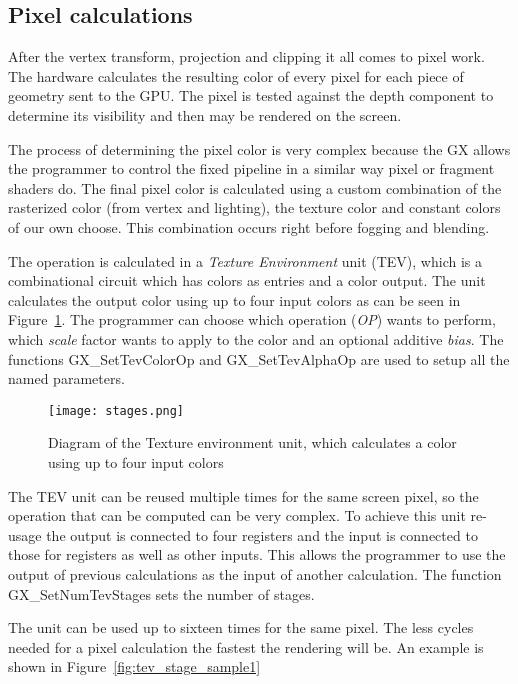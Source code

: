 \documentclass[12pt]{article}
\newcommand{\fname}[1] {{\color{blue}#1}}
\begin{document}
\subsection{Pixel calculations}

After the vertex transform, projection and clipping it all comes to pixel work. The hardware calculates the resulting color of every pixel for each piece of geometry sent to the GPU. The pixel is tested against the depth component to determine its visibility and then may be rendered on the screen.

The process of determining the pixel color is very complex because the GX allows the programmer to control the fixed pipeline in a similar way pixel or fragment shaders do. The final pixel color is calculated using a custom combination of the rasterized color (from vertex and lighting), the texture color and constant colors of our own choose. This combination occurs right before fogging and blending.

The operation is calculated in a \emph{Texture Environment} unit (TEV), which is a combinational circuit which has colors as entries and a color output. The unit calculates the output color using up to four input colors as can be seen in Figure~\ref{fig:gx_tev_op}. The programmer can choose which operation (\emph{OP}) wants to perform, which \emph{scale} factor wants to apply to the color and an optional additive \emph{bias}. The functions \fname{GX\_SetTevColorOp} and \fname{GX\_SetTevAlphaOp} are used to setup all the named parameters.

\begin{figure}[ht]
\centering
\texttt{[image: stages.png]}
\caption{Diagram of the Texture environment unit, which calculates a color using up to four input colors }
\label{fig:gx_tev_op}
\end{figure}

The TEV unit can be reused multiple times for the same screen pixel, so the operation that can be computed can be very complex. To achieve this unit re-usage the output is connected to four registers and the input is connected to those for registers as well as other inputs. This allows the programmer to use the output of previous calculations as the input of another calculation. The function \fname{GX\_SetNumTevStages} sets the number of stages.

The unit can be used up to sixteen times for the same pixel. The less cycles needed for a pixel calculation the fastest the rendering will be. An example is shown in Figure~\ref{fig:tev_stage_sample1}
\end{document}
